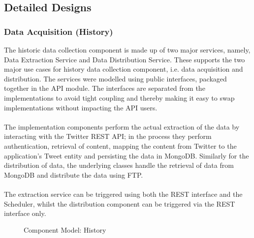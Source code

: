 \documentclass[12pt]{article} %
\begin{document}
	\subsection{Detailed Designs}
	
	\subsubsection{Data Acquisition (History)}
	
	The historic data collection component is made up of two major services, namely, Data Extraction Service and Data Distribution Service. These supports the two major use cases for history data collection component, i.e. data acquisition and distribution. The services were modelled using public interfaces, packaged together in the API module. The interfaces are separated from the implementations to avoid tight coupling and thereby making it easy to swap implementations without impacting the API users.
	\\
	\\
	The implementation components perform the actual extraction of the data by interacting with the Twitter REST API; in the process they perform authentication, retrieval of content, mapping the content from Twitter to the application’s Tweet entity and persisting the data in MongoDB. Similarly for the distribution of data, the underlying classes handle the retrieval of data from MongoDB and distribute the data using FTP.
	\\
	\\
	The extraction service can be triggered using both the REST interface and the Scheduler, whilst the distribution component can be triggered via the REST interface only.
	
	
		\begin{figure}[H] %
			\caption{Component Model: History}
			\label{fig:speciation}
		\end{figure}
	
\end{document}
